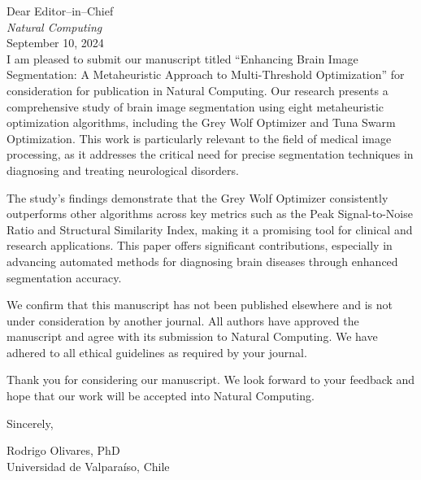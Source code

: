 \documentclass[11pt]{article}
\begin{document}
Dear Editor--in--Chief \\
{\em Natural Computing}\\
September 10, 2024\\

I am pleased to submit our manuscript titled ``Enhancing Brain Image Segmentation: A Metaheuristic Approach to Multi-Threshold Optimization'' for consideration for publication in Natural Computing. Our research presents a comprehensive study of brain image segmentation using eight metaheuristic optimization algorithms, including the Grey Wolf Optimizer and Tuna Swarm Optimization. This work is particularly relevant to the field of medical image processing, as it addresses the critical need for precise segmentation techniques in diagnosing and treating neurological disorders.

The study’s findings demonstrate that the Grey Wolf Optimizer consistently outperforms other algorithms across key metrics such as the Peak Signal-to-Noise Ratio and Structural Similarity Index, making it a promising tool for clinical and research applications. This paper offers significant contributions, especially in advancing automated methods for diagnosing brain diseases through enhanced segmentation accuracy.

We confirm that this manuscript has not been published elsewhere and is not under consideration by another journal. All authors have approved the manuscript and agree with its submission to Natural Computing. We have adhered to all ethical guidelines as required by your journal.

Thank you for considering our manuscript. We look forward to your feedback and hope that our work will be accepted into Natural Computing.

Sincerely,

Rodrigo Olivares, PhD\\
Universidad de Valpara\'iso, Chile
\end{document}
